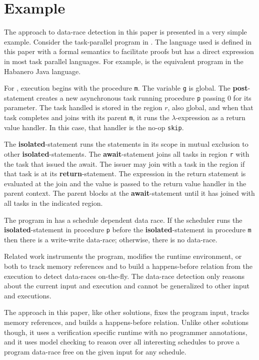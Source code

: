 \section{Example}
The approach to data-race detection in this paper is presented in a very simple example.
Consider the task-parallel program in .
The language used is defined in this paper with a formal semantics to facilitate proofs but has a direct expression in most task parallel languages.
For example,  is the equivalent program in the Habanero Java language.

For , execution begins with the procedure \texttt{m}.
The variable \texttt{g} is global.
The \textbf{post}-statement creates a new asynchronous task running procedure \texttt{p} passing 0 for its parameter.
The task handled is stored in the region $r$, also global, and when that task completes and joins with its parent \texttt{m}, it runs the $\lambda$-expression as a return value handler.
In this case, that handler is the no-op \texttt{skip}.

The \textbf{isolated}-statement runs the statements in its scope in mutual exclusion to other \textbf{isolated}-statements.
The \textbf{await}-statement joins all tasks in region \texttt{r} with the task that issued the await.
The issuer may join with a task in the region if that task is at its \textbf{return}-statement.
The expression in the return statement is evaluated at the join and the value is passed to the return value handler in the parent context.
The parent blocks at the \textbf{await}-statement until it has joined with all tasks in the indicated region.

The program in  has a schedule dependent data race.
If the scheduler runs the \textbf{isolated}-statement in procedure \texttt{p} before the \textbf{isolated}-statement in procedure \texttt{m} then there is a write-write data-race; otherwise, there is no data-race. 

Related work instruments the program, modifies the runtime environment, or both to track memory references and to build a happens-before relation from the execution to detect data-races on-the-fly.
The data-race detection only reasons about the current input and execution and cannot be generalized to other input and executions.

The approach in this paper, like other solutions, fixes the program input, tracks memory references, and builds a happens-before relation.
Unlike other solutions though, it uses a verification specific runtime with no programmer annotations, and it uses model checking to reason over all
interesting schedules to prove a program data-race free on the given input for any schedule.


